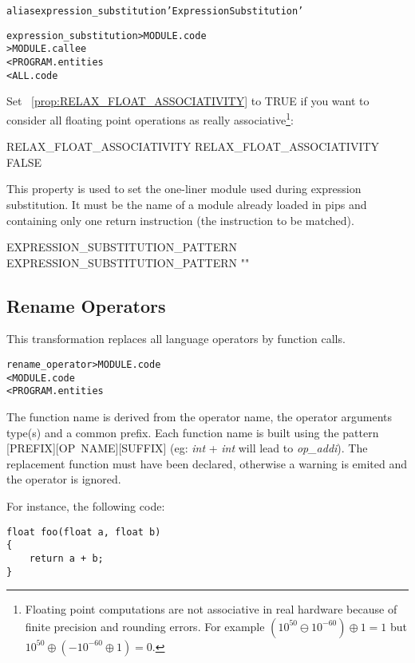 \documentclass[a4paper]{report}
\newenvironment{PipsMake}{\begin{alltt}}{\end{alltt}}
\newcommand{\PipsPropRef}[1]{\texttt{\detokenize{#1}}~\ref{prop:#1}}
\newenvironment{PipsPass}[1]{\label{pass:#1}}{}
\begin{document}
\begin{PipsMake}
alias expression_substitution 'Expression Substitution'

expression_substitution > MODULE.code
        > MODULE.callee
        < PROGRAM.entities
        < ALL.code
\end{PipsMake}

Set \PipsPropRef{RELAX_FLOAT_ASSOCIATIVITY} to TRUE if you want to
consider all floating point operations as really
associative\footnote{Floating point computations are not associative in
  real hardware because of finite precision and rounding errors. For
  example $(10^{50} \ominus 10^{-60}) \oplus 1 = 1$ but $10^{50} \oplus
  (-10^{-60} \oplus 1) = 0$.}:
\begin{PipsProp}{RELAX_FLOAT_ASSOCIATIVITY}
RELAX_FLOAT_ASSOCIATIVITY FALSE
\end{PipsProp}

This property is used to set the one-liner module used during
expression substitution. It must be the name of a module already
loaded in pips and containing only one return instruction (the
instruction to be matched).
\begin{PipsProp}{EXPRESSION_SUBSTITUTION_PATTERN}
EXPRESSION_SUBSTITUTION_PATTERN ""
\end{PipsProp}

\subsection{Rename Operators}

\begin{PipsPass}{rename_operator}
This transformation replaces all language operators by function calls.
\end{PipsPass}

\begin{PipsMake}
rename_operator > MODULE.code
                < MODULE.code
                < PROGRAM.entities
\end{PipsMake}

The function name is derived from the operator name, the operator
arguments type(s) and a common prefix. Each function name is built using
the pattern [PREFIX][OP~NAME][SUFFIX] (eg: \emph{int} + \emph{int}
will lead to \emph{op\_addi}). The replacement function must have been
declared, otherwise a warning is emited and the operator is ignored.

\vspace{5pt}
\begin{minipage}{\textwidth}
For instance, the following code:
\begin{lstlisting}
float foo(float a, float b)
{
    return a + b;
}
\end{lstlisting}
\end{minipage}
\end{document}
